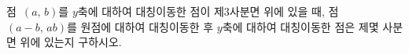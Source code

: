 점~$(a,\,b)$를 $y$축에 대하여 대칭이동한 점이 제$3$사분면 위에 있을 때, 점~$(a-b,\,ab)$를 원점에 대하여 대칭이동한 후 $y$축에 대하여 대칭이동한 점은 제몇 사분면 위에 있는지 구하시오.
